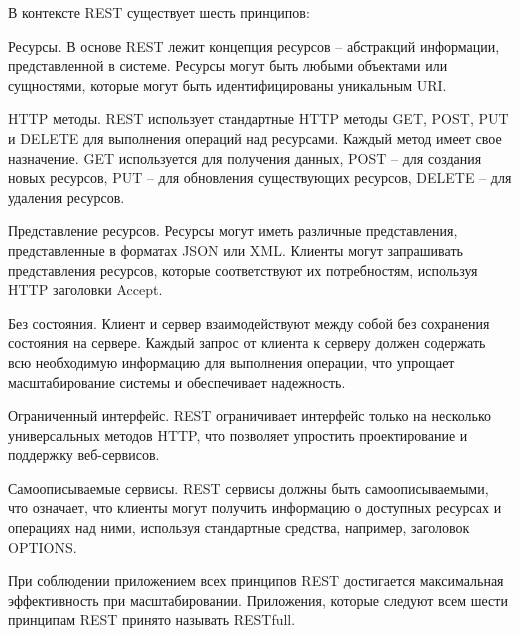 В контексте REST существует шесть принципов:
\begin{enumerate_num}
    \item Ресурсы.
    В основе REST лежит концепция ресурсов -- абстракций информации, представленной в системе.
    Ресурсы могут быть любыми объектами или сущностями, которые могут быть идентифицированы уникальным URI.
    \item HTTP методы.
    REST использует стандартные HTTP методы GET, POST, PUT и DELETE для выполнения операций над ресурсами.
    Каждый метод имеет свое назначение.
    GET используется для получения данных,
    POST -- для создания новых ресурсов,
    PUT -- для обновления существующих ресурсов,
    DELETE -- для удаления ресурсов.
    \item Представление ресурсов.
    Ресурсы могут иметь различные представления, представленные в форматах JSON или XML.
    Клиенты могут запрашивать представления ресурсов, которые соответствуют их потребностям, используя HTTP заголовки Accept.
    \item Без состояния.
    Клиент и сервер взаимодействуют между собой без сохранения состояния на сервере.
    Каждый запрос от клиента к серверу должен содержать всю необходимую информацию для выполнения операции, что упрощает масштабирование системы и обеспечивает надежность.
    \item Ограниченный интерфейс.
    REST ограничивает интерфейс только на несколько универсальных методов HTTP, что позволяет упростить проектирование и поддержку веб-сервисов.
    \item Самоописываемые сервисы.
    REST сервисы должны быть самоописываемыми, что означает, что клиенты могут получить информацию о доступных ресурсах и операциях над ними, используя стандартные средства, например, заголовок OPTIONS.
\end{enumerate_num}

При соблюдении приложением всех принципов REST достигается максимальная эффективность при масштабировании.
Приложения, которые следуют всем шести принципам REST принято называть RESTfull.



